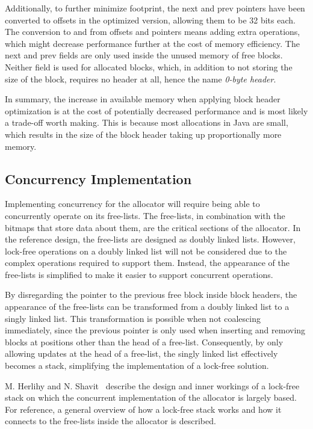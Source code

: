 Additionally, to further minimize footprint, the next and prev pointers have been converted to offsets in the optimized version, allowing them to be 32 bits each. The conversion to and from offsets and pointers means adding extra operations, which might decrease performance further at the cost of memory efficiency. The next and prev fields are only used inside the unused memory of free blocks. Neither field is used for allocated blocks, which, in addition to not storing the size of the block, requires no header at all, hence the name \textit{0-byte header}.

In summary, the increase in available memory when applying block header optimization is at the cost of potentially decreased performance and is most likely a trade-off worth making. This is because most allocations in Java are small, which results in the size of the block header taking up proportionally more memory.

\subsection{Concurrency Implementation}
\label{sec:adaptations_impl:concurrency}

Implementing concurrency for the allocator will require being able to concurrently operate on its free-lists. The free-lists, in combination with the bitmaps that store data about them, are the critical sections of the allocator. In the reference design, the free-lists are designed as doubly linked lists. However, lock-free operations on a doubly linked list will not be considered due to the complex operations required to support them. Instead, the appearance of the free-lists is simplified to make it easier to support concurrent operations.

By disregarding the pointer to the previous free block inside block headers, the appearance of the free-lists can be transformed from a doubly linked list to a singly linked list. This transformation is possible when not coalescing immediately, since the previous pointer is only used when inserting and removing blocks at positions other than the head of a free-list. Consequently, by only allowing updates at the head of a free-list, the singly linked list effectively becomes a stack, simplifying the implementation of a lock-free solution.

M. Herlihy and N. Shavit~\cite[Chapter 11]{artofmpprogramming} describe the design and inner workings of a lock-free stack on which the concurrent implementation of the allocator is largely based. For reference, a general overview of how a lock-free stack works and how it connects to the free-lists inside the allocator is described.

